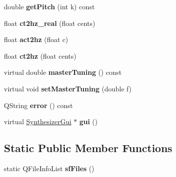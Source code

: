 \begin{DoxyCompactItemize}
double {\bfseries get\+Pitch} (int k) const
\item 
\mbox{\label{class_fluid_s_1_1_fluid_a53489d4ee7de927eefe80e80869cde98}} 
float {\bfseries ct2hz\+\_\+real} (float cents)
\item 
\mbox{\label{class_fluid_s_1_1_fluid_a87229cf909080be663146eeb3a6d8305}} 
float {\bfseries act2hz} (float c)
\item 
\mbox{\label{class_fluid_s_1_1_fluid_adcc610c4c7266d948a988258d08b164f}} 
float {\bfseries ct2hz} (float cents)
\item 
\mbox{\label{class_fluid_s_1_1_fluid_a28d1fb38f55b442a0002ec08b46a3779}} 
virtual double {\bfseries master\+Tuning} () const
\item 
\mbox{\label{class_fluid_s_1_1_fluid_a95d8929b59451bd1718dfde34ed1f0d4}} 
virtual void {\bfseries set\+Master\+Tuning} (double f)
\item 
\mbox{\label{class_fluid_s_1_1_fluid_a504c7540395b26ddd27abe7121bb625f}} 
Q\+String {\bfseries error} () const
\item 
\mbox{\label{class_fluid_s_1_1_fluid_a16587ab222d897b999ef510d43e40dc0}} 
virtual \hyperlink{class_ms_1_1_synthesizer_gui}{Synthesizer\+Gui} $\ast$ {\bfseries gui} ()
\end{DoxyCompactItemize}
\subsection*{Static Public Member Functions}
\begin{DoxyCompactItemize}
\item 
\mbox{\label{class_fluid_s_1_1_fluid_af5d6460d9bcd67a0118e46af7f974790}} 
static Q\+File\+Info\+List {\bfseries sf\+Files} ()
\end{DoxyCompactItemize}
